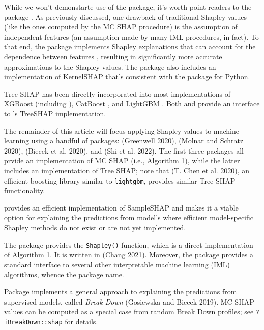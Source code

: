 While we won't demonstarte use of the package, it's worth point readers to the  package \citep{R-sellereite}. As previously discussed, one drawback of traditional Shapley values (like the ones computed by the MC SHAP procedure) is the assumption of independent features (an assumption made by many IML procedures, in fact). To that end, the  package implements Shapley explanations that can account for the dependence between features \citep{aas-2019-explaining}, resulting in significantly more accurate approximations to the Shapley values. The package also includes an implementation of KernelSHAP that's consistent with the  package for Python.

Tree SHAP has been directly incorporated into most implementations of XGBoost \citep{chen-2016-xgboost} (including  \citep{R-xgboost}), CatBoost \citep{eronika-2017-catboost}, and LightGBM \citep{ke-2017-lightgbm}. Both  \citep{R-fastshap} and  \citep{R-SHAPforxgboost} provide an interface to 's TreeSHAP implementation.

The remainder of this article will focus applying Shapley values to machine learning using a handful of packages:  (Greenwell 2020),  (Molnar and Schratz 2020),  (Biecek et al. 2020), and  (Shi et al. 2022). The first three packages all prvide an implementation of MC SHAP (i.e., Algorithm 1), while the latter includes an implementation of Tree SHAP; note that  (T. Chen et al. 2020), an efficient boosting library similar to \texttt{lightgbm}, provides similar Tree SHAP functionality.

 provides an efficient implementation of SampleSHAP and makes it a viable option for explaining the predictions from model's where efficient model-specific Shapley methods do not exist or are not yet implemented.

The  package provides the \texttt{Shapley()} function, which is a direct implementation of Algorithm 1. It is written in  (Chang 2021). Moreover, the  package provides a standard interface to several other interpretable machine learning (IML) algorithms, whence the package name.

Package  implements a general approach to explaining the predictions from supervised models, called \emph{Break Down} (Gosiewska and Biecek 2019). MC SHAP values can be computed as a special case from random Break Down profiles; see \texttt{?iBreakDown::shap} for details.

